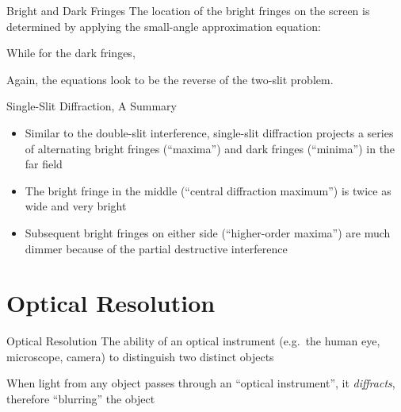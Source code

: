 \documentclass[12pt,compress,aspectratio=169]{beamer}
\begin{document}
\begin{frame}{Bright and Dark Fringes}
  The location of the bright fringes on the screen is determined by applying
  the small-angle approximation equation:
  

  While for the dark fringes, 


  Again, the equations look to be the reverse of the two-slit problem.
\end{frame}



\begin{frame}{Single-Slit Diffraction, A Summary}
  \begin{itemize}
  \item Similar to the double-slit interference, single-slit diffraction
    projects a series of alternating bright fringes (``maxima'') and dark
    fringes (``minima'') in the far field
  \item The bright fringe in the middle (``central diffraction maximum'') is
    twice as wide  and very bright
  \item Subsequent bright fringes on either side (``higher-order maxima'') are
    much dimmer because of the partial destructive interference
  \end{itemize}
  \begin{center}
  \end{center}
\end{frame}



\section{Optical Resolution}

\begin{frame}{Optical Resolution}
  The ability of an optical instrument (e.g.\ the human eye, microscope,
  camera) to distinguish two distinct objects
  \begin{center}
  \end{center}
  When light from any object passes through an ``optical instrument'', it
  \emph{diffracts}, therefore ``blurring'' the object
\end{frame}
\end{document}
